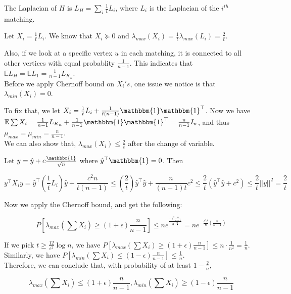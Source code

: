 \documentclass[11pt]{article}
\begin{document}
The Laplacian of $H$ is $L_H = \sum_{i} \frac{1}{t} L_i$, where $L_i$ is the Laplacian of the $i^{th}$ matching.

Let $X_i = \frac{1}{t} L_i$. We know that $X_i \succeq 0$ and $\lambda_{max}(X_i) = \frac{1}{t} \lambda_{max}(L_i)=\frac{2}{t}$.

Also, if we look at a specific vertex $u$ in each matching, it is connected to all other vertices with equal probablity $\frac{1}{n-1}$. This indicates that $\mathbb{E}L_H = \mathbb{E}L_1 = \frac{1}{n-1} L_{K_n}$. \\

Before we apply Chernoff bound on $X_i's$, one issue we notice is that $\lambda_{min}(X_i)=0$.

To fix that, we let $X_i = \frac{1}{t} L_i + \frac{1}{t(n-1)} \mathbbm{1}\mathbbm{1}^{\top}$. Now we have $\mathbb{E}\sum X_i = \frac{1}{n-1} L_{K_n} + \frac{1}{n-1} \mathbbm{1}\mathbbm{1}^{\top} = \frac{n}{n-1} I_n$, and thus $\mu_{max}=\mu_{min}=\frac{n}{n-1}$.\\

We can also show that, $\lambda_{max}(X_i) \le \frac{2}{t}$ after the change of variable.

Let $y = \hat{y} + c \frac{\mathbbm{1}}{\sqrt{n}}$ where $\hat{y}^{\top}\mathbbm{1}=0$. Then

\[
	y^{\top} X_i y = \hat{y}^{\top} (\frac{1}{t} L_i) \hat{y} + \frac{c^2n}{t(n-1)} \le (\frac{2}{t})\hat{y}^{\top}\hat{y} + \frac{n}{(n-1)t} c^2 \le \frac{2}{t} (\hat{y}^{\top}\hat{y}+c^2) \le \frac{2}{t} ||y||^2 = \frac{2}{t}
\]

\hfill \break

Now we apply the Chernoff bound, and get the following:

\[
	P[\lambda_{max}(\sum X_i) \ge (1+\epsilon) \frac{n}{n-1}] \le n e^\frac{-\epsilon^2 \frac{n}{n-1}}{3 \cdot \frac{2}{t}} = n e^{-\frac{\epsilon^2 t}{6}(\frac{n}{n-1})}
\]

If we pick $t \ge \frac{12}{\epsilon^2} \log n$, we have $P[\lambda_{max}(\sum X_i) \ge (1+\epsilon)\frac{n}{n-1}] \le n \cdot \frac{1}{n^2} = \frac{1}{n}$. \\

Similarly, we have $P[\lambda_{min}(\sum X_i) \le (1-\epsilon) \frac{n}{n-1}] \le \frac{1}{n}$. \\

Therefore, we can conclude that, with probability of at least $1 - \frac{2}{n}$,

\[
	\lambda_{max}(\sum X_i) \le (1+\epsilon)\frac{n}{n-1}, \lambda_{min}(\sum X_i) \ge (1-\epsilon)\frac{n}{n-1}
\]
\end{document}

